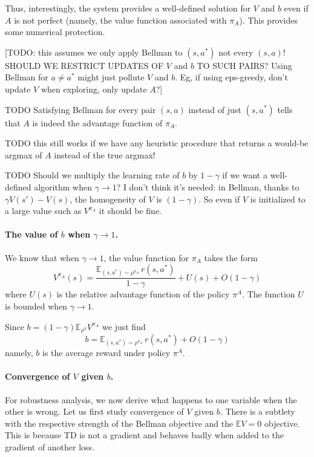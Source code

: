 \documentclass[11pt]{article}
\newcommand{\E}{\mathbb{E}}
\begin{document}
Thus, interestingly, the system provides a well-defined solution for $V$
and $b$ even if $A$ is not perfect (namely, the value function associated
with $\pi_A$). This provides some numerical protection.

[TODO: this assumes we only apply Bellman to $(s,a^\ast)$ not every
$(s,a)$! SHOULD WE RESTRICT UPDATES OF $V$ and $b$ TO SUCH PAIRS? Using
Bellman for $a\neq a^\ast$ might just pollute $V$ and $b$. Eg, if using
eps-greedy, don't update $V$ when exploring, only update $A$?]

TODO Satisfying Bellman for every pair $(s,a)$ instead of just $(s,a^\ast)$
tells that $A$ is indeed the advantage function of $\pi_A$.

TODO this still works if we have any heuristic procedure that returns a
would-be argmax of $A$ instead of the true argmax!

TODO Should we multiply the learning rate of $b$ by $1-\gamma$ if we want
a well-defined algorithm when $\gamma\to 1$? I don't think it's needed: in
Bellman, thanks to $\gamma V(s')-V(s)$, the homogeneity of $V$ is
$(1-\gamma)$. So even if $V$ is initialized to a large value such as
$V^{\pi_A}$ it should be fine.

\paragraph{The value of $b$ when $\gamma\to 1$.}
We know that when $\gamma\to 1$, the value function for $\pi_A$ takes the form
\begin{equation}
\label{eq:reladv}
	V^{\pi_A}(s) = \frac{\E_{(s,a^\ast)\sim\rho^{\pi_A}}\,r(s,a^\ast) }{1 - \gamma} +
	U(s) + O(1-\gamma)
\end{equation}
where $U(s)$ is the relative advantage function of the policy $\pi^A$.
The function $U$
is bounded when $\gamma\to 1$.

Since $b=(1-\gamma)\E_{\rho^\pi} V^{\pi_A}$ we just find
\begin{equation}
b=\E_{(s,a^\ast)\sim\rho^{\pi_A}}\,r(s,a^\ast)+O(1-\gamma)
\end{equation}
namely, $b$ is the average reward under policy $\pi^A$.

\paragraph{Convergence of $V$ given $b$.} For robustness analysis, we now
derive what happens to one variable when the other is wrong. Let us first
study convergence of $V$ given $b$. There is a subtlety with the
respective strength of the Bellman objective and the $\E V=0$ objective.
This is because TD is not a gradient and behaves badly when added to the
gradient of another loss.
\end{document}
